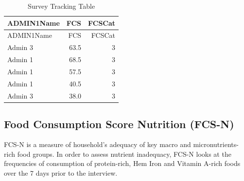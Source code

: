 \documentclass[
  letterpaper,
  DIV=11,
  numbers=noendperiod]{scrreprt}
\begin{document}
\begin{longtable}[]{@{}lrr@{}}
\caption{Survey Tracking Table}\tabularnewline
\toprule\noalign{}
ADMIN1Name & FCS & FCSCat \\
\midrule\noalign{}
\endfirsthead
\toprule\noalign{}
ADMIN1Name & FCS & FCSCat \\
\midrule\noalign{}
\endhead
\bottomrule\noalign{}
\endlastfoot
Admin 3 & 63.5 & 3 \\
Admin 1 & 68.5 & 3 \\
Admin 1 & 57.5 & 3 \\
Admin 1 & 40.5 & 3 \\
Admin 3 & 38.0 & 3 \\
\end{longtable}

\subsection{Food Consumption Score Nutrition
(FCS-N)}\label{food-consumption-score-nutrition-fcs-n}

FCS-N is a measure of household's adequacy of key macro and
micronutrients-rich food groups. In order to assess nutrient inadequacy,
FCS-N looks at the frequencies of consumption of protein-rich, Hem Iron
and Vitamin A-rich foods over the 7 days prior to the interview.
\end{document}
